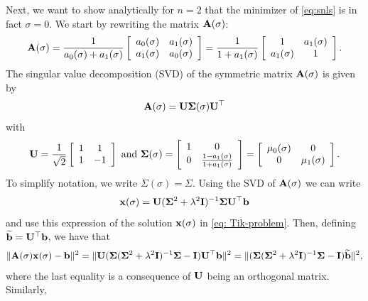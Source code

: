 \documentclass[onefignum,onetabnum]{siamart171218}
\newcommand{\bA}{{\bf A}}
\newcommand{\bI}{{\bf I}}
\newcommand{\bU}{{\bf U}}
\newcommand{\bb}{{\bf b}}
\newcommand{\bx}{{\bf x}}
\newcommand{\bSigma}{{\bf \Sigma}}
\begin{document}
Next, we want to show analytically for $n=2$ that the minimizer of \eqref{eq:snls} is in fact $\sigma=0$. 
We start by rewriting the matrix $\bA(\sigma)$:
\begin{equation*}\bA(\sigma) = \frac{1}{a_0(\sigma)+a_1(\sigma)}\left[ \begin{array}{cc} a_0(\sigma) & a_1(\sigma) \\ a_1(\sigma) & a_0(\sigma)\end{array}\right] =  \frac{1}{1+a_1(\sigma)}\left[ \begin{array}{cc} 1 & a_1(\sigma) \\ a_1(\sigma) & 1\end{array}\right]. \end{equation*} The singular value decomposition (SVD) of the symmetric matrix $\bA(\sigma)$ is given by 
\[\bA(\sigma) = \bU \bSigma (\sigma) \bU^\top\] 
with 
\begin{equation*}\bU = \frac{1}{\sqrt{2}}\left[\begin{array}{cc} 1 & 1 \\ 1 & -1\end{array} \right] \mbox{ and } \bSigma (\sigma) = \left[\begin{array}{cc} 1 & 0 \\ 0 & \frac{1-a_1(\sigma)}{1+a_1(\sigma)}\end{array} \right] = \left[\begin{array}{cc} \mu_0(\sigma) & 0 \\ 0 & \mu_1(\sigma)\end{array} \right].\end{equation*}
To simplify notation, we write $\Sigma(\sigma)=\Sigma$.
Using the SVD of $\bA(\sigma)$ we can %
write
\begin{equation*}\bx(\sigma) = \bU (\bSigma^2 + \lambda^2 \bI)^{-1} \bSigma \bU^{\top} \bb\end{equation*}
and %
use this expression of the solution $\bx(\sigma)$ in \eqref{eq: Tik-problem}. Then, defining $\widetilde{\bb} = \bU^\top \bb$, we have that
\begin{align*}
\| \bA(\sigma) \bx(\sigma) - \bb\|^2 = 
\| \bU (\bSigma (\bSigma^2 + \lambda^2 \bI)^{-1} \bSigma  - \bI) \bU^{\top} \bb\|^2= \| (\bSigma (\bSigma^2 + \lambda^2 \bI)^{-1} \bSigma  - \bI) \widetilde{\bb}\|^2, 
\end{align*}
where the last equality is a consequence of $\bU$ being an orthogonal matrix. Similarly,
\end{document}
